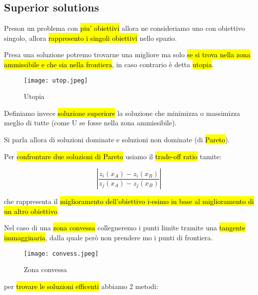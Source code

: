 \subsection{Superior solutions}

Preson un problema con \hl{piu' obiettivi} allora ne consideriamo uno con obiettivo singolo, allora \hl{rappresento i singoli obiettivi} nello spazio.

Presa una soluzione potremo trovarne una migliore ma solo \hl{se si trova nella zona ammissibile e che sia nella frontiera}, in caso contrario è detta \hl{utopia}.

\begin{figure}[H]
\centering
\texttt{[image: utop.jpeg]}
\caption{Utopia} 
\label{utop}
\end{figure}

Definiamo invece \hl{soluzione superiore} la soluzione che minimizza o massimizza meglio di tutte (come U se fosse nella zona ammissibile).

Si parla allora di soluzioni dominate e soluzioni non dominate (di \hl{Pareto}).

Per \hl{confrontare due soluzioni di Pareto} usiamo il \hl{trade-off ratio} tamite:

$$|\frac{z_i(x_A)-z_i(x_B)}{z_j(x_A)-z_j(x_B)}|$$

che rappresenta il \hl{miglioramento dell'obiettivo i-esimo in base al miglioramento di un altro obiettivo}.

Nel caso di una \hl{zona convessa} collegneremo i punti limite tramite una \hl{tangente immagginaria}, dalla quale però non prendere mo i punti di frontiera.

\begin{figure}[H]
\centering
\texttt{[image: convess.jpeg]}
\caption{Zona convessa} 
\label{convess}
\end{figure}

per \hl{trovare le soluzioni efficenti} abbiamo 2 metodi:

